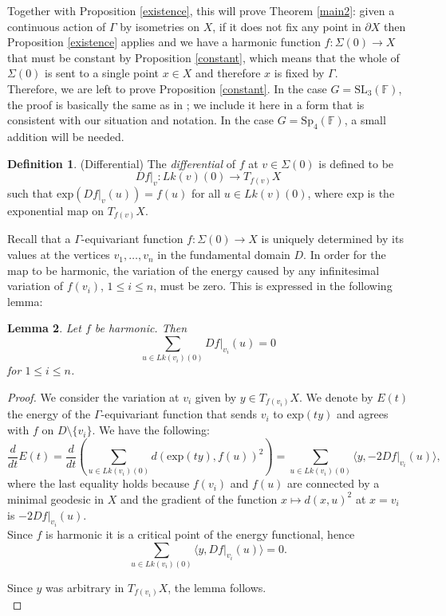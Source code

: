 \documentclass{article}
\theoremstyle{definition}
\newtheorem{dfn}{Definition}[section]
\theoremstyle{remark}
\theoremstyle{plain}
\newtheorem{lem}[dfn]{Lemma}
\begin{document}
Together with Proposition \ref{existence}, this will prove Theorem \ref{main2}: given a continuous action of $\Gamma$ by isometries on $X$, if it does not fix any point in $\partial X$ then Proposition \ref{existence} applies and we have a harmonic function $f: \Sigma(0)\rightarrow X$ that must be constant by Proposition \ref{constant}, which means that the whole of $\Sigma(0)$ is sent to a single point $x\in X$ and therefore $x$ is fixed by $\Gamma$. \\

Therefore, we are left to prove Proposition \ref{constant}. In the case $G=\mathrm{SL}_3(\mathbb{F})$, the proof is basically the same as in \cite{wang}; we include it here in a form that is consistent with our situation and notation. In the case $G=\mathrm{Sp}_4(\mathbb{F})$, a small addition will be needed. \\

\begin{dfn}{(Differential)}
    The \textit{differential} of $f$ at $v\in\Sigma(0)$ is defined to be $$Df|_v: Lk(v)(0)\rightarrow T_{f(v)}X$$ such that $\mathrm{exp}(Df|_v(u))=f(u)$ for all $u\in Lk(v)(0)$, where $\mathrm{exp}$ is the exponential map on $T_{f(v)}X$. \\
\end{dfn}

Recall that a $\Gamma$-equivariant function $f: \Sigma(0)\rightarrow X$ is uniquely determined by its values at the vertices $v_1,\ldots,v_n$ in the fundamental domain $D$. In order for the map to be harmonic, the variation of the energy caused by any infinitesimal variation of $f(v_i)$, $1\leq i\leq n$, must be zero. This is expressed in the following lemma:

\begin{lem} \label{sum0}
    Let $f$ be harmonic. Then $$\sum_{u\in Lk(v_i)(0)}{Df|_{v_i}(u)}=0$$ for $1\leq i\leq n$.
\end{lem}

\begin{proof}
    We consider the variation at $v_i$ given by $y\in T_{f(v_i)}X$. We denote by $E(t)$ the energy of the $\Gamma$-equivariant function that sends $v_i$ to $\mathrm{exp}(ty)$ and agrees with $f$ on $D\setminus\{v_i\}$. We have the following:
    \begin{equation*}
        \frac{d}{dt}E(t)=\frac{d}{dt}\left(\sum_{u\in Lk(v_i)(0)}{d(\mathrm{exp}(ty),f(u))^2}\right)=\sum_{u\in Lk(v_i)(0)}{\langle y,-2Df|_{v_i}(u)\rangle},
    \end{equation*}
    where the last equality holds because $f(v_i)$ and $f(u)$ are connected by a minimal geodesic in $X$ and the gradient of the function $x\mapsto d(x,u)^2$ at $x=v_i$ is $-2Df|_{v_i}(u)$. \\
    
    Since $f$ is harmonic it is a critical point of the energy functional, hence $$\sum_{u\in Lk(v_i)(0)}{\langle y,Df|_{v_i}(u)\rangle}=0.$$
    
    Since $y$ was arbitrary in $T_{f(v_i)}X$, the lemma follows. \\
\end{proof}
\end{document}
